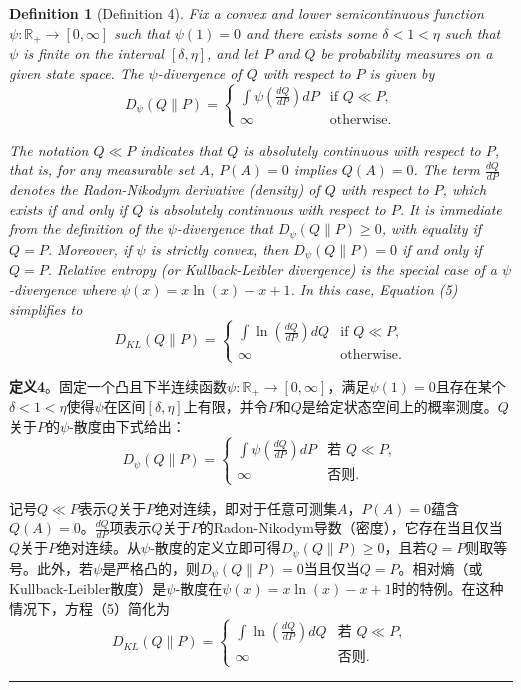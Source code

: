\documentclass[12pt,a4paper]{article}
\newenvironment{translation}
  {\par\noindent\color{blue!70!black}\smallskip}
  {\par\medskip\hrule\medskip}
\newtheorem{definition}[theorem]{Definition}
\begin{document}
\begin{definition}[Definition 4]
Fix a convex and lower semicontinuous function $\psi: \mathbb{R}_+ \to [0, \infty]$ such that $\psi(1) = 0$ and there exists some $\delta < 1 < \eta$ such that $\psi$ is finite on the interval $[\delta, \eta]$, and let $P$ and $Q$ be probability measures on a given state space. The $\psi$-divergence of $Q$ with respect to $P$ is given by
\[
D_\psi(Q\|P) = \begin{cases}
\int \psi\left(\frac{dQ}{dP}\right) dP & \text{if } Q \ll P, \\
\infty & \text{otherwise}.
\end{cases}
\]

The notation $Q \ll P$ indicates that $Q$ is absolutely continuous with respect to $P$, that is, for any measurable set $A$, $P(A) = 0$ implies $Q(A) = 0$. The term $\frac{dQ}{dP}$ denotes the Radon-Nikodym derivative (density) of $Q$ with respect to $P$, which exists if and only if $Q$ is absolutely continuous with respect to $P$. It is immediate from the definition of the $\psi$-divergence that $D_\psi(Q\|P) \geq 0$, with equality if $Q = P$. Moreover, if $\psi$ is strictly convex, then $D_\psi(Q\|P) = 0$ if and only if $Q = P$. Relative entropy (or Kullback-Leibler divergence) is the special case of a $\psi$-divergence where $\psi(x) = x\ln(x) - x + 1$. In this case, Equation (5) simplifies to
\[
D_{KL}(Q\|P) = \begin{cases}
\int \ln\left(\frac{dQ}{dP}\right) dQ & \text{if } Q \ll P, \\
\infty & \text{otherwise}.
\end{cases}
\]
\end{definition}
\begin{translation}
\textbf{定义4}。固定一个凸且下半连续函数$\psi: \mathbb{R}_+ \to [0, \infty]$，满足$\psi(1) = 0$且存在某个$\delta < 1 < \eta$使得$\psi$在区间$[\delta, \eta]$上有限，并令$P$和$Q$是给定状态空间上的概率测度。$Q$关于$P$的$\psi$-散度由下式给出：
\[
D_\psi(Q\|P) = \begin{cases}
\int \psi\left(\frac{dQ}{dP}\right) dP & \text{若 } Q \ll P, \\
\infty & \text{否则}.
\end{cases}
\]

记号$Q \ll P$表示$Q$关于$P$绝对连续，即对于任意可测集$A$，$P(A) = 0$蕴含$Q(A) = 0$。$\frac{dQ}{dP}$项表示$Q$关于$P$的Radon-Nikodym导数（密度），它存在当且仅当$Q$关于$P$绝对连续。从$\psi$-散度的定义立即可得$D_\psi(Q\|P) \geq 0$，且若$Q = P$则取等号。此外，若$\psi$是严格凸的，则$D_\psi(Q\|P) = 0$当且仅当$Q = P$。相对熵（或Kullback-Leibler散度）是$\psi$-散度在$\psi(x) = x\ln(x) - x + 1$时的特例。在这种情况下，方程（5）简化为
\[
D_{KL}(Q\|P) = \begin{cases}
\int \ln\left(\frac{dQ}{dP}\right) dQ & \text{若 } Q \ll P, \\
\infty & \text{否则}.
\end{cases}
\]
\end{translation}
\end{document}
